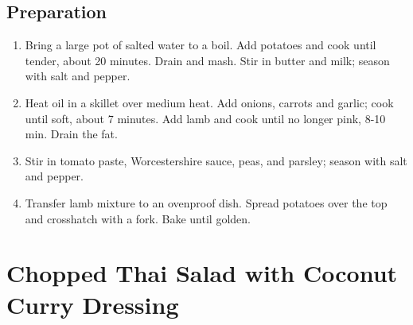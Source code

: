 \documentclass[ansiapaper,10pt,english]{sphinxmanual}
\begin{document}
\section{Preparation}
\label{\detokenize{Shep_Pie:preparation}}\begin{enumerate}
\item {} 
Bring a large pot of salted water to a boil. Add potatoes and cook until tender, about 20 minutes. Drain and mash. Stir in butter and milk; season with salt and pepper.

\item {} 
Heat oil in a skillet over medium heat. Add onions, carrots and garlic; cook until soft, about 7 minutes. Add lamb and cook until no longer pink, 8-10 min. Drain the fat.

\item {} 
Stir in tomato paste, Worcestershire sauce, peas, and parsley; season with salt and pepper.

\item {} 
Transfer lamb mixture to an ovenproof dish. Spread potatoes over the top and crosshatch with a fork. Bake until golden.

\end{enumerate}


\chapter{Chopped Thai Salad with Coconut Curry Dressing}
\label{\detokenize{Chop_Thai_Salad_w_Peanut_Sauce:chopped-thai-salad-with-coconut-curry-dressing}}\label{\detokenize{Chop_Thai_Salad_w_Peanut_Sauce::doc}}
\end{document}
